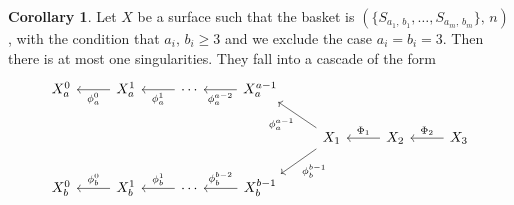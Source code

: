 \documentclass[11pt]{amsbook}
\theoremstyle{definition}
\theoremstyle{definition}
\newtheorem{cor}[thm]{Corollary}
\theoremstyle{definition}
\theoremstyle{definition}
\theoremstyle{definition}
\theoremstyle{definition}
\theoremstyle{definition}
\theoremstyle{definition}
\begin{document}
\begin{cor}\label{doublecurve}
Let $X$ be a surface such that the basket is  $(\{ S_{a_1, \, b_1}, \dots , S_{a_m, \, b_m} \}, \, n )$ , with the condition that $a_i, \, b_i \geq 3$ and we exclude the case $a_i = b_i = 3$. Then there is at most one singularities. They fall into a cascade of the form
\[
\begin{tikzcd}
X_a^0 & X_a^1 \arrow[l, "\phi_a^0"]  & \cdots \arrow[l, "\phi_a^1"]  & X_a^{a-1}  \arrow[l, "\phi_a^{a-2}"] &                                                           &                        \\
      &                              &                               &                                      & X_1 \arrow[ld, "\phi_b^{b-1}"] \arrow[lu, "\phi_a^{a-1}"] & X_2 \arrow[l, "\Phi_1"'] & X_3 \arrow[l, "\Phi_2"']\\
X_b^0 & X_b^1 \arrow[l, "\phi_b^0"'] & \cdots \arrow[l, "\phi_b^1"'] & X_b^{b-1} \arrow[l, "\phi_b^{b-2}"'] &                                                           &                       
\end{tikzcd}
\]
\end{cor}
\end{document}
